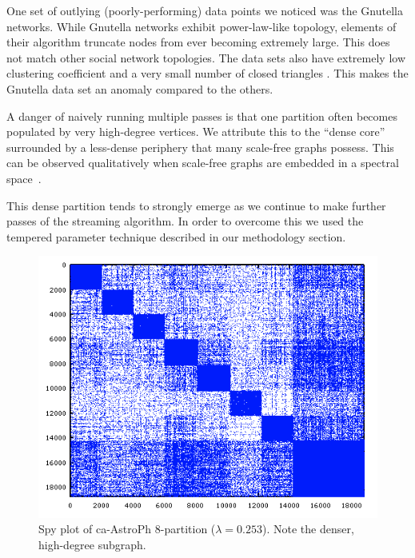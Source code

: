 One set of outlying (poorly-performing) data points we noticed was the Gnutella networks.
While Gnutella networks exhibit power-law-like topology, elements of their algorithm truncate nodes from ever becoming extremely large. 
This does not match other social network topologies.
The data sets also have extremely low clustering coefficient and a very small number of closed triangles \cite{Ripeanu:2002:MGN:613352.613670}. 
This makes the Gnutella data set an anomaly compared to the others.

A danger of naively running multiple passes is that one partition often becomes populated by very high-degree vertices. 
We attribute this to the ``dense core'' surrounded by a less-dense periphery that many scale-free graphs possess.
This can be observed qualitatively when scale-free graphs are embedded in a spectral space~\cite{Lang04findinggood}.

This dense partition tends to strongly emerge as we continue to make further passes of the streaming algorithm.
In order to overcome this we used the tempered parameter technique described in our methodology section. 

\begin{figure}[h!]
\centering
  \includegraphics[width=0.8\columnwidth]{figures/astroPh8.png}
  \caption{Spy plot of ca-AstroPh 8-partition ($\lambda=0.253$). Note the denser, high-degree subgraph.}
  \label{fig:dense}
\end{figure}


